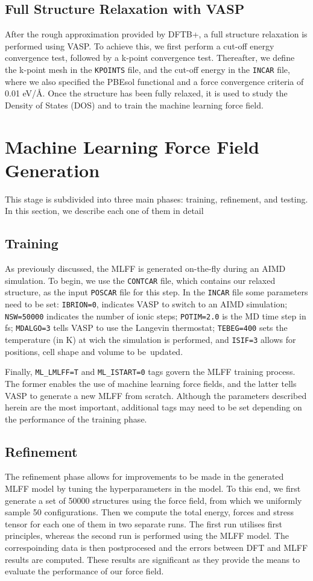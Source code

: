 \subsection{Full Structure Relaxation with VASP}
After the rough approximation provided by DFTB+, a full structure relaxation is performed using VASP. To achieve this, we first perform a cut-off energy convergence test, followed by a k-point convergence test. Thereafter, we define the k-point mesh in the \texttt{KPOINTS} file, and the cut-off energy in the \texttt{INCAR} file, where we also specified the PBEsol functional and a force convergence criteria of 0.01 eV/\AA. Once the structure has been fully relaxed, it is used to study the Density of States (DOS) and to train the machine learning force field.

\section{Machine Learning Force Field Generation}
\label{sec:mlff-generation}
This stage is subdivided into three main phases: training, refinement, and testing. In this section, we describe each one of them in detail 
\subsection{Training}
As previously discussed, the MLFF is generated on-the-fly during an AIMD simulation. To begin, we use the \texttt{CONTCAR} file, which contains our relaxed structure, as the input \texttt{POSCAR} file for this step. In the \texttt{INCAR} file some parameters need to be set: \texttt{IBRION=0}, indicates VASP to switch to an AIMD simulation; \texttt{NSW=50000} indicates the number of ionic steps; \texttt{POTIM=2.0} is the MD time step in fs; \texttt{MDALGO=3} tells VASP to use the Langevin thermostat; \texttt{TEBEG=400} sets the temperature (in K) at wich the simulation is performed, and \texttt{ISIF=3} allows for positions, cell shape and volume to be~updated. 

Finally, \texttt{ML\_LMLFF=T} and \texttt{ML\_ISTART=0} tags govern the MLFF training process. The former enables the use of machine learning force fields, and the latter tells VASP to generate a new MLFF from scratch. Although the parameters described herein are the most important, additional tags may need to be set depending on the performance of the training phase.

\subsection{Refinement}
The refinement phase allows for improvements to be made in the generated MLFF model by tuning the hyperparameters in the model. To this end, we first generate a set of 50000 structures using the force field, from which we uniformly sample 50 configurations. Then we compute the total energy, forces and stress tensor for each one of them in two separate runs. The first run utilises first principles, whereas the second run is performed using the MLFF model. The correspoinding data is then postprocesed and the errors between DFT and MLFF results are computed. These results are significant as they provide the means to evaluate the performance of our force field. 

